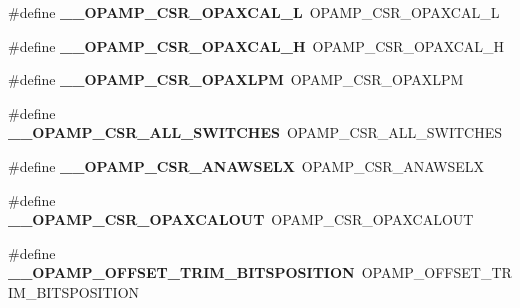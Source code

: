\begin{DoxyCompactItemize}
\item 
\hypertarget{group___h_a_l___o_p_a_m_p___aliased___macros_ga476dfa7349959c398e971c4e96e656ad}{\#define {\bfseries \-\_\-\-\_\-\-O\-P\-A\-M\-P\-\_\-\-C\-S\-R\-\_\-\-O\-P\-A\-X\-C\-A\-L\-\_\-\-L}~O\-P\-A\-M\-P\-\_\-\-C\-S\-R\-\_\-\-O\-P\-A\-X\-C\-A\-L\-\_\-\-L}\label{group___h_a_l___o_p_a_m_p___aliased___macros_ga476dfa7349959c398e971c4e96e656ad}

\item 
\hypertarget{group___h_a_l___o_p_a_m_p___aliased___macros_ga0fec50091b520af8698fddad86932f0d}{\#define {\bfseries \-\_\-\-\_\-\-O\-P\-A\-M\-P\-\_\-\-C\-S\-R\-\_\-\-O\-P\-A\-X\-C\-A\-L\-\_\-\-H}~O\-P\-A\-M\-P\-\_\-\-C\-S\-R\-\_\-\-O\-P\-A\-X\-C\-A\-L\-\_\-\-H}\label{group___h_a_l___o_p_a_m_p___aliased___macros_ga0fec50091b520af8698fddad86932f0d}

\item 
\hypertarget{group___h_a_l___o_p_a_m_p___aliased___macros_gad32527d90ee52b1a01ca9d4708d49546}{\#define {\bfseries \-\_\-\-\_\-\-O\-P\-A\-M\-P\-\_\-\-C\-S\-R\-\_\-\-O\-P\-A\-X\-L\-P\-M}~O\-P\-A\-M\-P\-\_\-\-C\-S\-R\-\_\-\-O\-P\-A\-X\-L\-P\-M}\label{group___h_a_l___o_p_a_m_p___aliased___macros_gad32527d90ee52b1a01ca9d4708d49546}

\item 
\hypertarget{group___h_a_l___o_p_a_m_p___aliased___macros_ga8baa137838166f683fe84ba887fbaae2}{\#define {\bfseries \-\_\-\-\_\-\-O\-P\-A\-M\-P\-\_\-\-C\-S\-R\-\_\-\-A\-L\-L\-\_\-\-S\-W\-I\-T\-C\-H\-E\-S}~O\-P\-A\-M\-P\-\_\-\-C\-S\-R\-\_\-\-A\-L\-L\-\_\-\-S\-W\-I\-T\-C\-H\-E\-S}\label{group___h_a_l___o_p_a_m_p___aliased___macros_ga8baa137838166f683fe84ba887fbaae2}

\item 
\hypertarget{group___h_a_l___o_p_a_m_p___aliased___macros_ga7eabece68a39d88bbd36c17dda9da7dc}{\#define {\bfseries \-\_\-\-\_\-\-O\-P\-A\-M\-P\-\_\-\-C\-S\-R\-\_\-\-A\-N\-A\-W\-S\-E\-L\-X}~O\-P\-A\-M\-P\-\_\-\-C\-S\-R\-\_\-\-A\-N\-A\-W\-S\-E\-L\-X}\label{group___h_a_l___o_p_a_m_p___aliased___macros_ga7eabece68a39d88bbd36c17dda9da7dc}

\item 
\hypertarget{group___h_a_l___o_p_a_m_p___aliased___macros_ga07a3019c291d8ee540821dec9c5a2bd0}{\#define {\bfseries \-\_\-\-\_\-\-O\-P\-A\-M\-P\-\_\-\-C\-S\-R\-\_\-\-O\-P\-A\-X\-C\-A\-L\-O\-U\-T}~O\-P\-A\-M\-P\-\_\-\-C\-S\-R\-\_\-\-O\-P\-A\-X\-C\-A\-L\-O\-U\-T}\label{group___h_a_l___o_p_a_m_p___aliased___macros_ga07a3019c291d8ee540821dec9c5a2bd0}

\item 
\hypertarget{group___h_a_l___o_p_a_m_p___aliased___macros_ga45a1e3e121f1289a77b4f43b91d050aa}{\#define {\bfseries \-\_\-\-\_\-\-O\-P\-A\-M\-P\-\_\-\-O\-F\-F\-S\-E\-T\-\_\-\-T\-R\-I\-M\-\_\-\-B\-I\-T\-S\-P\-O\-S\-I\-T\-I\-O\-N}~O\-P\-A\-M\-P\-\_\-\-O\-F\-F\-S\-E\-T\-\_\-\-T\-R\-I\-M\-\_\-\-B\-I\-T\-S\-P\-O\-S\-I\-T\-I\-O\-N}\label{group___h_a_l___o_p_a_m_p___aliased___macros_ga45a1e3e121f1289a77b4f43b91d050aa}


\end{DoxyCompactItemize}
